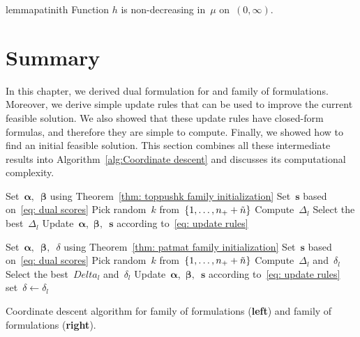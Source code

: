 \begin{restatable}{lemma}{patinith}\label{lemma: patmat family initialization h}
  Function $h$ is non-decreasing in~$\mu$ on~$(0,\infty)$.
\end{restatable}

\pagebreak

\section{Summary}

In this chapter, we derived dual formulation for \TopPushK and \PatMat family of formulations. Moreover, we derive simple update rules that can be used to improve the current feasible solution. We also showed that these update rules have closed-form formulas, and therefore they are simple to compute. Finally, we showed how to find an initial feasible solution. This section combines all these intermediate results into Algorithm~\ref{alg:Coordinate descent} and discusses its computational complexity.

\begin{algorithm*}
  \begin{minipage}{0.48\textwidth}
    \centering
    \begin{algorithmic}[1]
      \State Set~$\bm{\alpha},$~$\bm{\beta}$ using Theorem~\ref{thm: toppushk family initialization}
      \State Set~$\bm{s}$ based on~\eqref{eq: dual scores} \label{alg: line 1}
      \Repeat \label{alg: line 2}
        \State Pick random~$k$ from~$\{1, \ldots, n_{+} + \tilde{n}\}$ \label{alg: line 3}
         \label{alg: line 4}
            \State Compute~$\Delta_{l}$  \label{alg: line 5}
        \EndFor
        \State Select the best~$\Delta_{l}$ \label{alg: line 7}
        \State Update~$\bm{\alpha}$,~$\bm{\beta},$~$\bm{s}$ according to~\eqref{eq: update rules} \label{alg: line 8}
        \State \label{alg: line 9}
    \end{algorithmic}
  \end{minipage}%
  \hfill
  \begin{minipage}{0.48\textwidth}
    \centering
    \begin{algorithmic}[1]
      \State Set~$\bm{\alpha},$~$\bm{\beta},$~$\delta$ using Theorem~\ref{thm: patmat family initialization}
      \State Set~$\bm{s}$ based on~\eqref{eq: dual scores}
      \Repeat
        \State Pick random~$k$ from~$\{1, \ldots, n_{+} + \tilde{n} \}$ 
            \State Compute~$\Delta_{l}$ and~$\delta_{l}$
        \EndFor
        \State Select the best~$Delta_{l}$ and~$\delta_{l}$
        \State Update~$\bm{\alpha}$,~$\bm{\beta},$~$\bm{s}$ according to~\eqref{eq: update rules}
        \State set~$\delta \leftarrow \delta_{l}$
    \end{algorithmic}
  \end{minipage}
  \caption{Coordinate descent algorithm for \TopPushK family of formulations (\textbf{left}) and \PatMat  family of formulations (\textbf{right}).}
  \label{alg:Coordinate descent}
\end{algorithm*}

